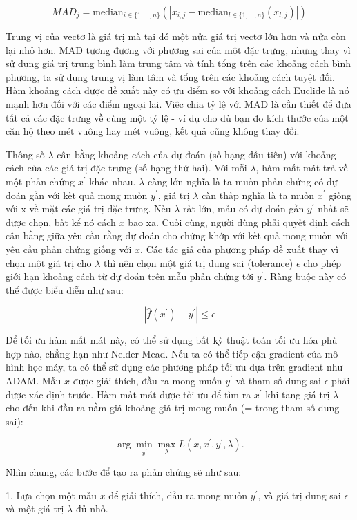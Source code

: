 $$MAD_j=\text{median}_{i\in{}\{1,\ldots,n\}}(|x_{i,j}-\text{median}_{l\in{}\{1,\ldots,n\}}(x_{l,j})|)$$

Trung vị của vectơ là giá trị mà tại đó một nửa giá trị vectơ lớn hơn và nửa còn lại nhỏ hơn. MAD tương đương với phương sai của một đặc trưng, nhưng thay vì sử dụng giá trị trung bình làm trung tâm và tính tổng trên các khoảng cách bình phương, ta sử dụng trung vị làm tâm và tổng trên các khoảng cách tuyệt đối. Hàm khoảng cách được đề xuất này có ưu điểm so với khoảng cách Euclide là nó mạnh hơn đối với các điểm ngoại lai. Việc chia tỷ lệ với MAD là cần thiết để đưa tất cả các đặc trưng về cùng một tỷ lệ - ví dụ cho dù bạn đo kích thước của một căn hộ theo mét vuông hay mét vuông, kết quả cũng không thay đổi.

Thông số $\lambda$ cân bằng khoảng cách của dự đoán (số hạng đầu tiên) với khoảng cách của các giá trị đặc trưng (số hạng thứ hai). Với mỗi $\lambda$, hàm mất mát trả về một phản chứng $x^\prime$ khác nhau. $\lambda$ càng lớn nghĩa là ta muốn phản chứng có dự đoán gần với kết quả mong muốn $y^\prime$, giá trị $\lambda$ càn thấp nghĩa là ta muốn $x^\prime$ giống với x về mặt các giá trị đặc trưng. Nếu $\lambda$ rất lớn, mẫu có dự đoán gần $y^\prime$ nhất sẽ được chọn, bất kể nó cách $x$ bao xa. Cuối cùng, người dùng phải quyết định cách cân bằng giữa yêu cầu rằng dự đoán cho chứng khớp với kết quả mong muốn với yêu cầu phản chứng giống với $x$. Các tác giả của phương pháp đề xuất thay vì chọn một giá trị cho $\lambda$ thì nên chọn một giá trị dung sai (tolerance) $\epsilon$ cho phép giới hạn khoảng cách từ dự đoán trên mẫu phản chứng tới $y^\prime$. Ràng buộc này có thể được biểu diễn như sau:

$$|\hat{f}(x^\prime)-y^\prime|\leq\epsilon$$

Để tối ưu hàm mất mát này, có thể sử dụng bất kỳ thuật toán tối ưu hóa phù hợp nào, chẳng hạn như Nelder-Mead. Nếu ta có thể tiếp cận gradient của mô hình học máy, ta có thể sử dụng các phương pháp tối ưu dựa trên gradient như ADAM. Mẫu $x$ được giải thích, đầu ra mong muốn $y^\prime$ và tham số dung sai $\epsilon$ phải được xác định trước. Hàm mất mát được tối ưu để tìm ra $x^\prime$ khi tăng giá trị $\lambda$ cho đến khi đầu ra nằm giá khoảng giá trị mong muốn (= trong tham số dung sai):

$$\arg\min_{x^\prime}\max_{\lambda}L(x,x^\prime,y^\prime,\lambda).$$

Nhìn chung, các bước để tạo ra phản chứng sẽ như sau:

1. Lựa chọn một mẫu $x$ để giải thích, đầu ra mong muốn $y^\prime$, và giá trị dung sai $\epsilon$ và một giá trị $\lambda$ đủ nhỏ.


